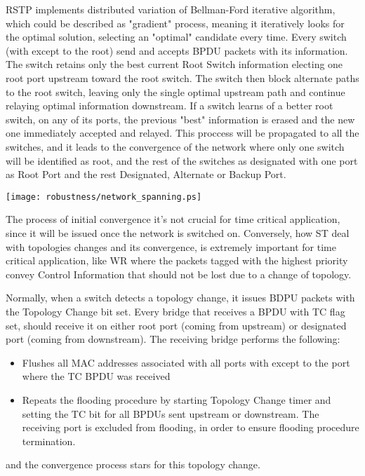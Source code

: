 RSTP implements distributed variation of Bellman-Ford iterative
algorithm, which could be described as "gradient" process, meaning it iteratively looks for the
optimal solution, selecting an "optimal" candidate every time. Every switch
(with except to the root) send and  accepts BPDU packets
with its information. The switch retains only the best current Root Switch
information electing one root port upstream toward the root switch. The switch
then block alternate paths to the root switch, leaving only the single optimal
upstream path and continue relaying optimal information downstream. If a switch
learns of a better root switch, on any of its ports, the previous "best"
information is erased and the new one immediately accepted and relayed. This
proccess will be propagated to all the switches, and it leads to the convergence
of the network where only one switch will be identified as root, and the rest of
the switches as designated with one port as Root Port and the rest Designated,
Alternate or Backup Port.


\begin{center}
        \texttt{[image: robustness/network\_spanning.ps]}
        \label{fig:free_loops}
\end{center}

The process of initial convergence it's not crucial for time
critical application, since it will be issued once the network is switched on.
Conversely, how ST deal with topologies changes and its
convergence, is extremely important for time critical application, like WR where
the packets tagged with the highest priority convey Control Information that
should not be lost due to a change of topology.

Normally, when a switch detects a topology change, it issues BDPU packets with
the Topology Change bit set. Every bridge that receives a BPDU with TC flag set,
should  receive it on either root port (coming from upstream) or designated port
(coming from downstream). The receiving bridge performs the following:
\begin{itemize}

        \item Flushes all MAC addresses associated with all ports with except to
the port where the TC BPDU was received
        \item Repeats the flooding procedure by starting Topology Change timer
and setting the TC bit for all BPDUs sent upstream or downstream. The receiving
port is excluded from flooding, in order to ensure flooding procedure
termination.
\end{itemize}
and the convergence process stars for this topology change. 



